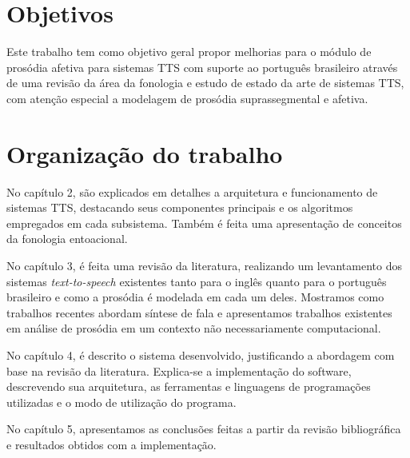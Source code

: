 \section{Objetivos}
Este trabalho tem como objetivo geral propor melhorias para o módulo de prosódia
afetiva para sistemas TTS com suporte ao português brasileiro através de uma
revisão da área da fonologia e estudo de estado da arte de sistemas TTS, com
atenção especial a modelagem de prosódia suprassegmental e afetiva.

\section{Organização do trabalho}

No capítulo 2, são explicados em detalhes a arquitetura e funcionamento de sistemas
TTS, destacando seus componentes principais e os algoritmos empregados em cada
subsistema. Também é feita uma apresentação de conceitos da fonologia entoacional.


No capítulo 3, é feita uma revisão da literatura, realizando um levantamento dos
sistemas \emph{text-to-speech} existentes tanto para o inglês quanto para o
português brasileiro e como a prosódia é modelada em cada um deles. Mostramos
como trabalhos recentes abordam síntese de fala e apresentamos trabalhos
existentes em análise de prosódia em um contexto não necessariamente
computacional.

No capítulo 4, é descrito o sistema desenvolvido, justificando a abordagem com
base na revisão da literatura. Explica-se a implementação do software,
descrevendo sua arquitetura, as ferramentas e linguagens de programações
utilizadas e o modo de utilização do programa.

No capítulo 5, apresentamos as conclusões feitas a partir da revisão
bibliográfica e resultados obtidos com a implementação.
